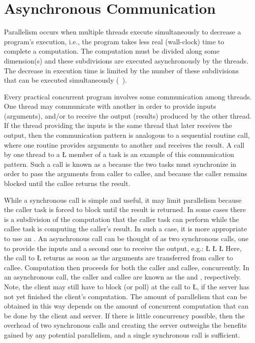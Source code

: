\documentclass[openright,twoside]{report}
\begin{document}
\chapter{Asynchronous Communication}
\label{s:AsynchronousCommunication}

Parallelism occurs when multiple threads execute simultaneously to decrease a program's execution, i.e., the program takes less real (wall-clock) time to complete a computation.
The computation must be divided along some dimension(s) and these subdivisions are executed asynchronously by the threads.
The decrease in execution time is limited by the number of these subdivisions that can be executed simultaneously (~\cite{Amdahl67}).

Every practical concurrent program involves some communication among threads.
One thread may communicate with another in order to provide inputs (arguments), and/or to receive the output (results) produced by the other thread.
If the thread providing the inputs is the same thread that later receives the output, then the communication pattern is analogous to a sequential routine call, where one routine provides arguments to another and receives the result.
A call by one thread to a \LGinlinetrue\LGbegin\lgrinde\L{}\endlgrinde\LGend{} member of a task is an example of this communication pattern.
Such a call is known as a  because the two tasks must synchronize in order to pass the arguments from caller to callee, and because the caller remains blocked until the callee returns the result.

While a synchronous call is simple and useful, it may limit parallelism because the caller task is forced to block until the result is returned.
In some cases there is a subdivision of the computation that the caller task can perform while the callee task is computing the caller's result.
In such a case, it is more appropriate to use an .
An asynchronous call can be thought of as two synchronous calls, one to provide the inputs and a second one to receive the output, e.g.:
\LGinlinefalse\LGbegin\lgrinde
\L{}
\CE{}\L{}
\CE{}\L{}
\CE{}\endlgrinde\LGend
Here, the call to \LGinlinetrue\LGbegin\lgrinde\L{}\endlgrinde\LGend{} returns as soon as the arguments are transferred from caller to callee.
Computation then proceeds for both the caller and callee, concurrently.
In an asynchronous call, the caller and callee are known as the  and , respectively.
Note, the client may still have to block (or poll) at the call to \LGinlinetrue\LGbegin\lgrinde\L{}\endlgrinde\LGend{}, if the server has not yet finished the client's computation.
The amount of parallelism that can be obtained in this way depends on the amount of concurrent computation that can be done by the client and server.
If there is little concurrency possible, then the overhead of two synchronous calls and creating the server outweighs the benefits gained by any potential parallelism, and a single synchronous call is sufficient.
\end{document}
